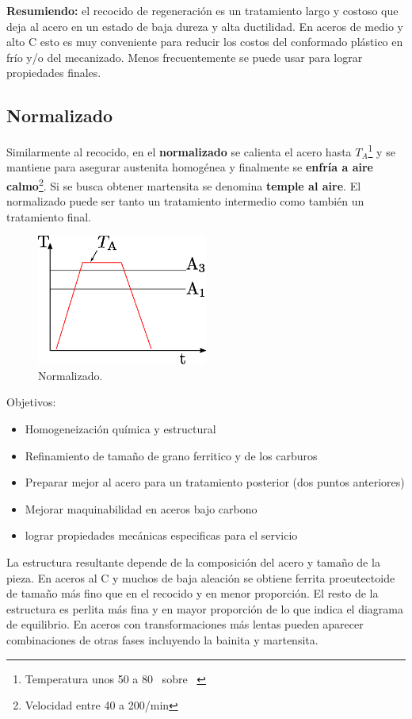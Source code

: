 \textbf{Resumiendo:} el recocido de regeneración es un tratamiento largo y costoso que deja al acero en un estado de baja dureza y alta ductilidad. En aceros de medio y alto C esto es muy conveniente para reducir los costos del conformado plástico en frío y/o del mecanizado. Menos frecuentemente se puede usar para lograr propiedades finales.

\subsection{Normalizado}
Similarmente al recocido, en el \textbf{normalizado} se calienta el acero hasta $T_A$\footnote{Temperatura unos 50 a 80\grad~ sobre \Athree~} y se mantiene para asegurar austenita homogénea y finalmente se \textbf{enfría a aire calmo}\footnote{Velocidad entre 40 a 200\grad{}/min}. Si se busca obtener martensita se denomina \textbf{temple al aire}. El normalizado puede ser tanto un tratamiento intermedio como también un tratamiento final.

\begin{figure}[htb!]
    \centering
    \includegraphics[width=0.5\textwidth]{fig/TTnorm.eps}
    \caption{Normalizado.}
    \label{fig:TTnorm}
\end{figure}

Objetivos:
\begin{itemize}
    \item Homogeneización química y estructural
    \item Refinamiento de tamaño de grano ferritico y de los carburos
    \item Preparar mejor al acero para un tratamiento posterior (dos puntos anteriores)
    \item Mejorar maquinabilidad en aceros bajo carbono
    \item lograr propiedades mecánicas especificas para el servicio
\end{itemize}

La estructura resultante depende de la composición del acero y tamaño de la pieza. En aceros al C y muchos de baja aleación se obtiene ferrita proeutectoide de tamaño más fino que en el recocido y en menor proporción. El resto de la estructura es perlita más fina y en mayor proporción de lo que indica el diagrama de equilibrio. En aceros con transformaciones más lentas pueden aparecer combinaciones de otras fases incluyendo la bainita y martensita.

